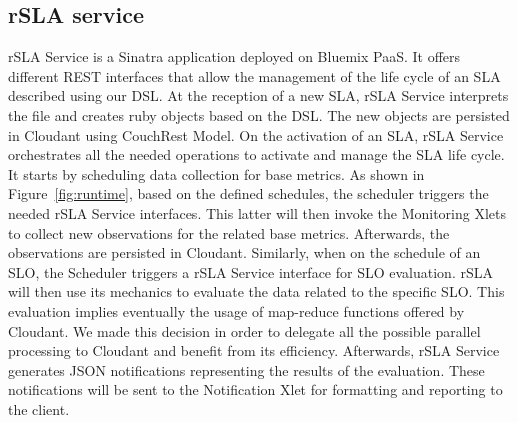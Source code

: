 \subsection{rSLA service}
rSLA Service is a Sinatra application deployed on Bluemix PaaS. It offers different REST interfaces that allow the management of the life cycle of an SLA described using our DSL.
At the reception of a new SLA, rSLA Service interprets the file and creates ruby objects based on the DSL. The new objects are persisted in Cloudant using CouchRest Model.
On the activation of an SLA, rSLA Service orchestrates all the needed operations to activate and manage the SLA life cycle. It starts by scheduling data collection for base 
metrics. As shown in Figure~\ref{fig:runtime}, based on the defined schedules, the scheduler triggers the needed rSLA Service interfaces. This latter will then invoke the 
Monitoring Xlets to collect new observations for the related base metrics. Afterwards, the observations are persisted in Cloudant. Similarly, when on the schedule of an SLO, the 
Scheduler triggers a rSLA Service interface for SLO evaluation. rSLA will then use its mechanics to evaluate the data related to the specific SLO. This evaluation implies 
eventually the usage of map-reduce functions offered by Cloudant. We made this decision in order to delegate all the possible parallel processing to Cloudant and benefit from its 
efficiency. Afterwards, rSLA Service generates JSON notifications representing the results of the evaluation. These notifications will be sent to the Notification Xlet for 
formatting and reporting to the client.   
